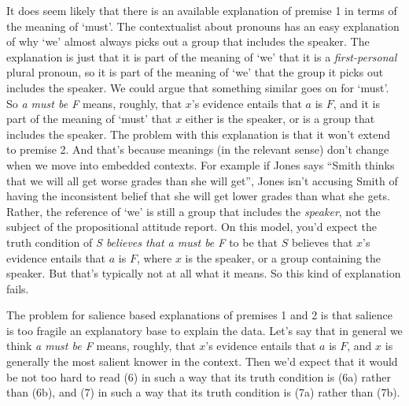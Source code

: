 It does seem likely that there is an available explanation of premise 1 in terms of the meaning of `must'. The contextualist about pronouns has an easy explanation of why `we' almost always picks out a group that includes the speaker. The explanation is just that it is part of the meaning of `we' that it is a \textit{first-personal} plural pronoun, so it is part of the meaning of `we' that the group it picks out includes the speaker. We could argue that something similar goes on for `must'. So \textit{a must be F} means, roughly, that $x$'s evidence entails that $a$ is $F$, and it is part of the meaning of `must' that $x$ either is the speaker, or is a group that includes the speaker. The problem with this explanation is that it won't extend to premise 2. And that's because meanings (in the relevant sense) don't change when we move into embedded contexts. For example if Jones says ``Smith thinks that we will all get worse grades than she will get'', Jones isn't accusing Smith of having the inconsistent belief that she will get lower grades than what she gets. Rather, the reference of `we' is still a group that includes the \textit{speaker}, not the subject of the propositional attitude report. On this model, you'd expect the truth condition of \textit{S believes that a must be F} to be that $S$ believes that $x$'s evidence entails that $a$ is $F$, where $x$ is the speaker, or a group containing the speaker. But that's typically not at all what it means. So this kind of explanation fails.

The problem for salience based explanations of premises 1 and 2 is that salience is too fragile an explanatory base to explain the data. Let's say that in general we think \textit{a must be F} means, roughly, that $x$'s evidence entails that $a$ is $F$, and $x$ is generally the most salient knower in the context. Then we'd expect that it would be not too hard to read (6) in such a way that its truth condition is (6a) rather than (6b), and  (7) in such a way that its truth condition is (7a) rather than (7b).


